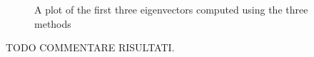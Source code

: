 \begin{figure}[H]
    \caption{A plot of the first three eigenvectors computed using the three methods}
    \label{Eigenvectors_comp_norm}
\end{figure}

TODO COMMENTARE RISULTATI. 